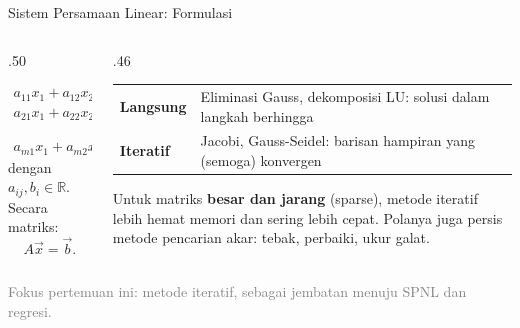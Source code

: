 \documentclass[aspectratio=169,10pt]{beamer}
\newcommand{\smallgray}[1]{\textcolor{GrayText}{\scriptsize #1}}
\begin{document}
\begin{frame}{Sistem Persamaan Linear: Formulasi}
\scriptsize
\begin{columns}[T,totalwidth=\textwidth]
\begin{column}{.50\textwidth}
\begin{bluebox}
\[
\begin{aligned}
a_{11}x_1+a_{12}x_2+\cdots+a_{1n}x_n&=b_1\\
a_{21}x_1+a_{22}x_2+\cdots+a_{2n}x_n&=b_2\\
&\;\;\vdots\\
a_{m1}x_1+a_{m2}x_2+\cdots+a_{mn}x_n&=b_m
\end{aligned}
\]
dengan $a_{ij},b_i\in\mathbb{R}$. Secara matriks:
\[
A\vec{x}=\vec{b}.
\]
\end{bluebox}
\end{column}
\begin{column}{.46\textwidth}
\begin{orangebox}
\begin{tabularx}{\linewidth}{>{\bfseries}p{.24\linewidth} X}
\toprule
Langsung & Eliminasi Gauss, dekomposisi LU: solusi dalam langkah berhingga\\
Iteratif & Jacobi, Gauss-Seidel: barisan hampiran yang (semoga) konvergen\\
\bottomrule
\end{tabularx}
\end{orangebox}
\begin{greenbox}
Untuk matriks \textbf{besar dan jarang} (sparse), metode iteratif lebih hemat memori dan sering lebih cepat. Polanya juga persis metode pencarian akar: tebak, perbaiki, ukur galat.
\end{greenbox}
\end{column}
\end{columns}
\vfill
\smallgray{Fokus pertemuan ini: metode iteratif, sebagai jembatan menuju SPNL dan regresi.}
\end{frame}
\end{document}
